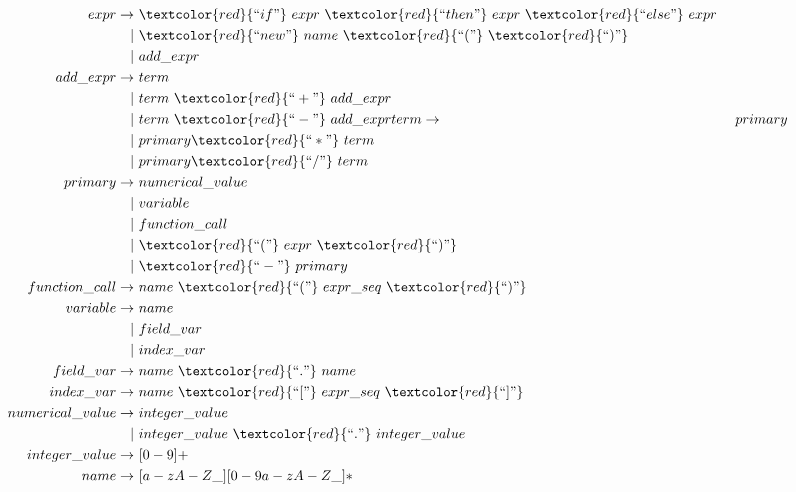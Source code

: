 \begin{align*}   
             expr \rightarrow & ~\textcolor{red}{``if"} ~expr ~\textcolor{red}{``then"} ~expr ~\textcolor{red}{``else"} ~expr \\
                   |& ~\textcolor{red}{``new"} ~name ~\textcolor{red}{``("} ~\textcolor{red}{``)"} \\
                   |& ~add\_expr \\  
         add\_expr \rightarrow & ~term \\
                   |& ~term ~\textcolor{red}{``+"} ~add\_expr \\
                   |& ~term ~\textcolor{red}{``-"} ~add\_expr            
             term \rightarrow & ~primary \\  
                   |& ~primary \textcolor{red}{``*"} ~term \\
                   |& ~primary \textcolor{red}{``/"} ~term \\
          primary \rightarrow & ~numerical\_value \\
                   |& ~variable \\
                   |& ~function\_call \\
                   |& ~\textcolor{red}{``("} ~expr ~\textcolor{red}{``)"} \\
                   |& ~\textcolor{red}{``-"} ~primary \\           
    function\_call \rightarrow & ~name ~\textcolor{red}{``("} ~expr\_seq ~\textcolor{red}{``)"} \\           
         variable \rightarrow & ~name \\
                   |& ~field\_var \\
                   |& ~index\_var \\              
        field\_var \rightarrow & ~name ~\textcolor{red}{``."} ~name \\
        index\_var \rightarrow & ~name ~\textcolor{red}{``["} ~expr\_seq ~\textcolor{red}{``]"} \\           
  numerical\_value \rightarrow & ~integer\_value \\
                   |& ~integer\_value ~\textcolor{red}{``."} ~integer\_value \\                  
    integer\_value \rightarrow & ~[0-9]+ \\            
             name \rightarrow & ~[a-zA-Z\_][0-9a-zA-Z\_]*
\end{align*}

